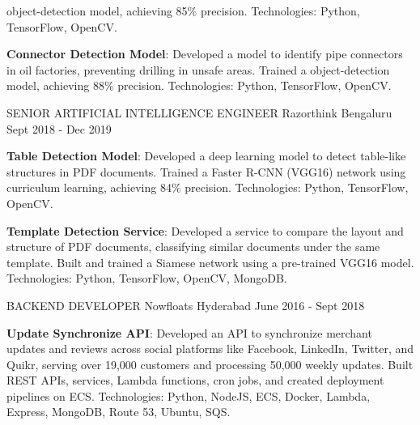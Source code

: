 \begin{cventries}
{\begin{cvitems}
{         object-detection model, 
        achieving 85\% precision. Technologies: Python, TensorFlow, OpenCV.}        
        \item{\textbf{Connector Detection Model}: Developed a model to identify 
        pipe connectors in oil factories, preventing drilling in unsafe areas. 
        Trained a  object-detection model, achieving 88\% precision. 
        Technologies: Python, TensorFlow, OpenCV.}
	\end{cvitems}
    }
\vspace{2em} %
  \cventry
    {SENIOR ARTIFICIAL INTELLIGENCE ENGINEER} %
    {Razorthink} %
    {Bengaluru} %
    {Sept 2018 - Dec 2019} %
    {
      \begin{cvitems} %
        \item{\textbf{Table Detection Model}: Developed a deep learning model to 
        detect table-like structures in PDF documents. Trained a Faster 
        R-CNN (VGG16) network using curriculum learning, 
        achieving 84\% precision. Technologies: Python, TensorFlow, OpenCV.}      
        \item{\textbf{Template Detection Service}: Developed a service to compare the 
        layout and structure of PDF documents, classifying similar documents under 
        the same template. Built and trained a Siamese network using a pre-trained 
        VGG16 model. Technologies: Python, TensorFlow, OpenCV, MongoDB.}       
	\end{cvitems}
    }
\vspace{2em} %
  \cventry
    {BACKEND DEVELOPER} %
    {Nowfloats} %
    {Hyderabad} %
    {June 2016 - Sept 2018} %
    {
      \begin{cvitems} %
        \item{\textbf{Update Synchronize API}: Developed an API to synchronize merchant updates and reviews across social platforms like Facebook, LinkedIn, Twitter, and Quikr, serving over 19,000 customers and processing 50,000 weekly updates. Built REST APIs, services, Lambda functions, cron jobs, and created deployment pipelines on ECS. Technologies: Python, NodeJS, ECS, Docker, Lambda, Express, MongoDB, Route 53, Ubuntu, SQS.}

\end{cvitems}}
\end{cventries}
